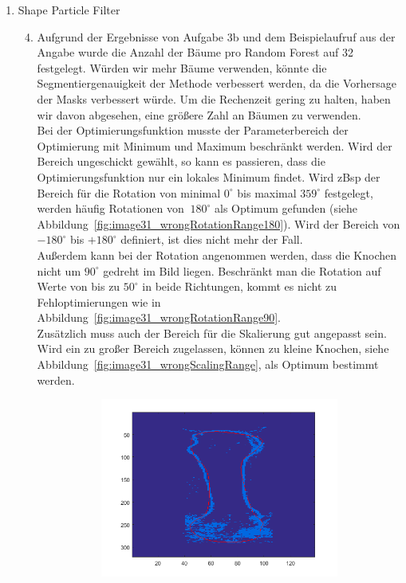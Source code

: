 \documentclass[]{report}
\begin{document}
\begin{enumerate}
		\item Shape Particle Filter
			\begin{enumerate}
				\setcounter{enumii}{3}
				\item
				Aufgrund der Ergebnisse von Aufgabe 3b und dem Beispielaufruf aus der Angabe wurde die Anzahl der Bäume pro Random Forest auf 32 festgelegt. Würden wir mehr Bäume verwenden, könnte die Segmentiergenauigkeit der Methode verbessert werden, da die Vorhersage der Masks verbessert würde. Um die Rechenzeit gering zu halten, haben wir davon abgesehen, eine größere Zahl an Bäumen zu verwenden.\\
				Bei der Optimierungsfunktion musste der Parameterbereich der Optimierung mit Minimum und Maximum beschränkt werden. Wird der Bereich ungeschickt gewählt, so kann es passieren, dass die Optimierungsfunktion nur ein lokales Minimum findet. Wird zBsp der Bereich für die Rotation von minimal $0^\circ$ bis maximal $359^\circ$ festgelegt, werden häufig Rotationen von $~180^\circ$ als Optimum gefunden (siehe Abbildung~\ref{fig:image31_wrongRotationRange180}).
				Wird der Bereich von $-180^\circ$ bis $+180^\circ$ definiert, ist dies nicht mehr der Fall.\\
				Außerdem kann bei der Rotation angenommen werden, dass die Knochen nicht um $90^\circ$ gedreht im Bild liegen. Beschränkt man die Rotation auf Werte von bis zu $50^\circ$ in beide Richtungen, kommt es nicht zu Fehloptimierungen wie in Abbildung~\ref{fig:image31_wrongRotationRange90}.\\
				Zusätzlich muss auch der Bereich für die Skalierung gut angepasst sein. Wird ein zu großer Bereich zugelassen, können zu kleine Knochen, siehe Abbildung~\ref{fig:image31_wrongScalingRange}, als Optimum bestimmt werden.\\
				\begin{figure}
					\begin{subfigure}[t]{0.3\textwidth}
						\centering
						\includegraphics[width=\textwidth]{figures/image31_wrongRotationRange180.png}

\end{subfigure}
\end{figure}
\end{enumerate}
\end{enumerate}
\end{document}

